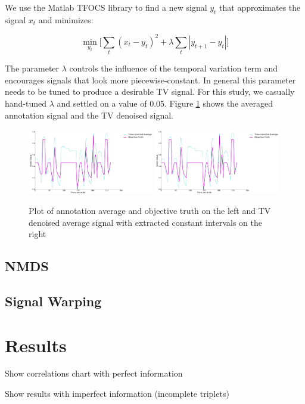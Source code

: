 \documentclass[]{article}
\begin{document}
We use the Matlab TFOCS library to find a new signal $y_t$ that approximates the signal $x_t$ and minimizes:

\[
\min_{y_t} \Big[\sum_{t} (x_t - y_t)^2 + \lambda\sum_{t} |y_{t+1} - y_{t}|\Big]
\]

The parameter $\lambda$ controls the influence of the temporal variation term and encourages signals that look more piecewise-constant.  In general this parameter needs to be tuned to produce a desirable TV signal.  For this study, we casually hand-tuned $\lambda$ and settled on a value of 0.05.  Figure \ref{fig:average_and_objective} shows the averaged annotation signal and the TV denoised signal.

\begin{figure}
	\centering
	\includegraphics[width=0.49\textwidth]{images/average_and_objective}
	\includegraphics[width=0.49\textwidth]{images/average_and_objective}
	\caption{Plot of annotation average and objective truth on the left and TV denoised average signal with extracted constant intervals on the right}
	\label{fig:average_and_objective}
\end{figure}

\subsection{NMDS}
\subsection{Signal Warping}
\section{Results}
Show correlations chart with perfect information

Show results with imperfect information (incomplete triplets)
\end{document}
